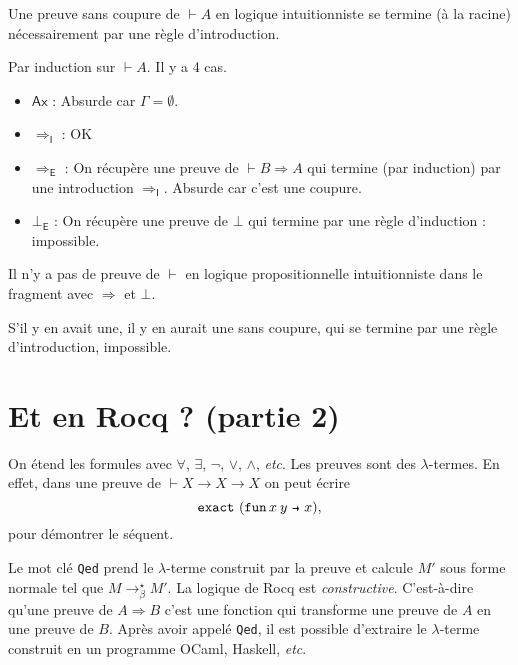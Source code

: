 \documentclass[./main]{subfiles}
\begin{document}
  \begin{lem}
    Une preuve sans coupure de $\vdash A$ en logique intuitionniste se termine (à la racine) nécessairement par une règle d'introduction.
  \end{lem}
  \begin{prv}
    Par induction sur $\vdash A$. Il y a 4 cas.
    \begin{itemize}
      \item $\mathsf{Ax}$ : Absurde car $\Gamma = \emptyset$.
      \item $\Rightarrow_\mathsf{I}$ : OK
      \item $\Rightarrow_\mathsf{E}$ : On récupère une preuve de $\vdash B \Rightarrow A$ qui termine (par induction) par une introduction $\Rightarrow_\mathsf{I}$. Absurde car c'est une coupure.
      \item $\bot_\mathsf{E}$ : On récupère une preuve de $\bot$ qui termine par une règle d'induction : impossible.
    \end{itemize}
  \end{prv}

  \begin{crlr}
    Il n'y a pas de preuve de $\vdash$ en logique propositionnelle intuitionniste dans le fragment avec $\Rightarrow$ et  $\bot$.
  \end{crlr}
  \begin{prv}
    S'il y en avait une, il y en aurait une sans coupure, qui se termine par une règle d'introduction, impossible.
  \end{prv}

  \section{Et en Rocq ? (partie 2)}

  On étend les formules avec $\forall$, $\exists$, $\lnot$, $\lor$, $\land$, \textit{etc}.
  Les preuves sont des $\lambda$-termes.
  En effet, dans une preuve de $\vdash X \to X \to X$ on peut écrire \[
    \mathtt{exact}\ (\fun{x\: y}{x})
  ,\]
  pour démontrer le séquent.

  Le mot clé \texttt{Qed} prend le $\lambda$-terme construit par la preuve et calcule $M'$ sous forme normale tel que $M \to_\beta^\star M'$.
  La logique de Rocq est \textit{constructive}. C'est-à-dire qu'une preuve de $A \Rightarrow B$ c'est une fonction qui transforme une preuve de $A$ en une preuve de $B$.
  Après avoir appelé  \texttt{Qed}, il est possible d'extraire le $\lambda$-terme construit en un programme OCaml, Haskell, \textit{etc}.
\end{document}

